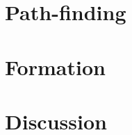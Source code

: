 \documentclass[a4paper]{article}
\begin{document}
 \section{Path-finding}
  
 
 \section{Formation}
 \label{sec:Formation}
  
\section{Discussion}
 \label{sec:Discussion}
  




\end{document}
